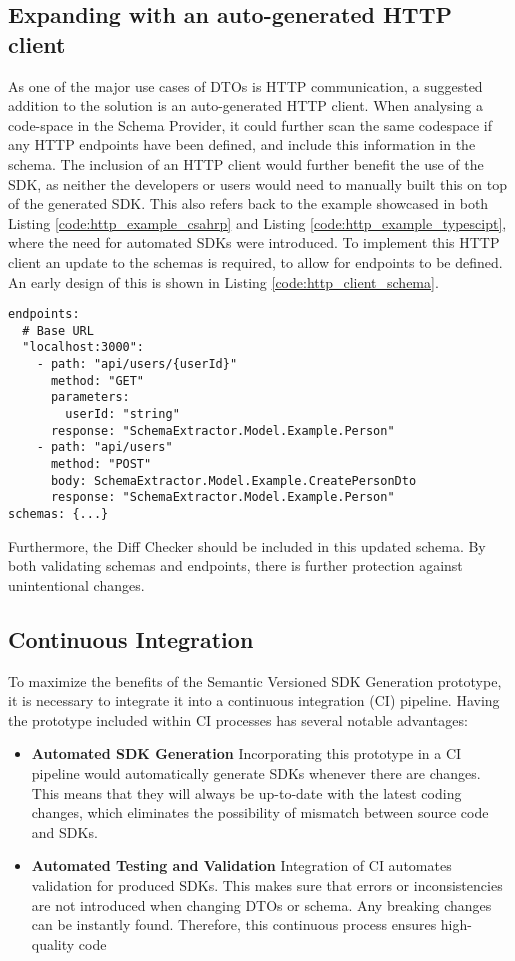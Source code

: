 \subsection{Expanding with an auto-generated HTTP client}
As one of the major use cases of DTOs is HTTP communication, a suggested addition to the solution is an auto-generated HTTP client. 
When analysing a code-space in the Schema Provider, it could further scan the same codespace if any HTTP endpoints have been defined, and include this information in the schema.
The inclusion of an HTTP client would further benefit the use of the SDK, as neither the developers or users would need to manually built this on top of the generated SDK.
This also refers back to the example showcased in both Listing \ref{code:http_example_csahrp} and Listing \ref{code:http_example_typescipt}, where the need for automated SDKs were introduced.
To implement this HTTP client an update to the schemas is required, to allow for endpoints to be defined. An early design of this is shown in Listing \ref{code:http_client_schema}.
\begin{lstlisting}[caption={Example of adding endpoints to the schema definition}, label={code:http_client_schema}, style=yaml]
endpoints:
  # Base URL
  "localhost:3000":
    - path: "api/users/{userId}"
      method: "GET"
      parameters:
        userId: "string"
      response: "SchemaExtractor.Model.Example.Person"
    - path: "api/users"
      method: "POST"
      body: SchemaExtractor.Model.Example.CreatePersonDto
      response: "SchemaExtractor.Model.Example.Person"
schemas: {...}
\end{lstlisting}
Furthermore, the Diff Checker should be included in this updated schema. By both validating schemas and endpoints, there is further protection against unintentional changes.


\subsection{Continuous Integration}
To maximize the benefits of the Semantic Versioned SDK Generation prototype, it is necessary to integrate it into a continuous integration (CI) pipeline. Having the prototype included within CI processes has several notable advantages:

\begin{itemize}
    \item \textbf{Automated SDK Generation} Incorporating this prototype in a CI pipeline would automatically generate SDKs whenever there are changes. This means that they will always be up-to-date with the latest coding changes, which eliminates the possibility of mismatch between source code and SDKs.
    
    \item \textbf{Automated Testing and Validation} Integration of CI automates validation for produced SDKs. This makes sure that errors or inconsistencies are not introduced when changing DTOs or schema. Any breaking changes can be instantly found. Therefore, this continuous process ensures high-quality code
\end{itemize}

